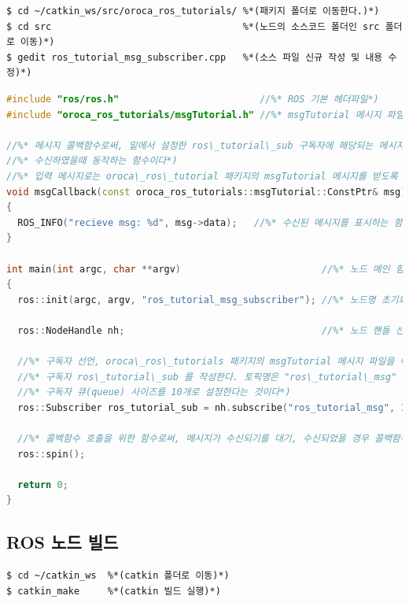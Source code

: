 \begin{lstlisting}[language=ROS]
$ cd ~/catkin_ws/src/oroca_ros_tutorials/ %*(패키지 폴더로 이동한다.)*)
$ cd src                                  %*(노드의 소스코드 폴더인 src 폴더로 이동)*)
$ gedit ros_tutorial_msg_subscriber.cpp   %*(소스 파일 신규 작성 및 내용 수정)*)
\end{lstlisting}

\begin{lstlisting}[language=C++]
#include "ros/ros.h"                         //%* ROS 기본 헤더파일*) 
#include "oroca_ros_tutorials/msgTutorial.h" //%* msgTutorial 메시지 파일 헤더*)

//%* 메시지 콜백함수로써, 밑에서 설정한 ros\_tutorial\_sub 구독자에 해당되는 메시지를*)
//%* 수신하였을때 동작하는 함수이다*)
//%* 입력 메시지로는 oroca\_ros\_tutorial 패키지의 msgTutorial 메시지를 받도록 되어있다 *)
void msgCallback(const oroca_ros_tutorials::msgTutorial::ConstPtr& msg)
{
  ROS_INFO("recieve msg: %d", msg->data);   //%* 수신된 메시지를 표시하는 함수*)
}

int main(int argc, char **argv)                         //%* 노드 메인 함수*)
{
  ros::init(argc, argv, "ros_tutorial_msg_subscriber"); //%* 노드명 초기화*)

  ros::NodeHandle nh;                                   //%* 노드 핸들 선언*)

  //%* 구독자 선언, oroca\_ros\_tutorials 패키지의 msgTutorial 메시지 파일을 이용한*)
  //%* 구독자 ros\_tutorial\_sub 를 작성한다. 토픽명은 "ros\_tutorial\_msg" 이며,*)
  //%* 구독자 큐(queue) 사이즈를 10개로 설정한다는 것이다*)
  ros::Subscriber ros_tutorial_sub = nh.subscribe("ros_tutorial_msg", 10, msgCallback);

  //%* 콜백함수 호출을 위한 함수로써, 메시지가 수신되기를 대기, 수신되었을 경우 콜백함수를 실행한다*)
  ros::spin();

  return 0;
}
\end{lstlisting}

\subsection{ROS 노드 빌드}

\begin{lstlisting}[language=ROS]
$ cd ~/catkin_ws  %*(catkin 폴더로 이동)*)
$ catkin_make     %*(catkin 빌드 실행)*)
\end{lstlisting}


